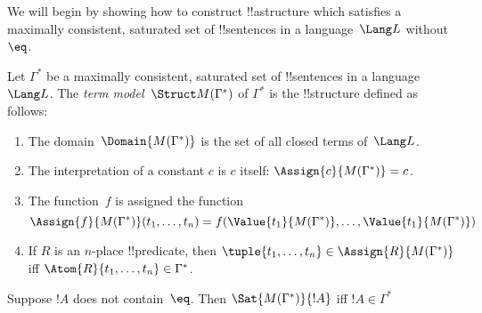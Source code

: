 \documentclass[../../include/open-logic-section]{subfiles}
\begin{document}

We will begin by showing how to construct !!a{structure} which
satisfies a maximally consistent, saturated set of !!{sentence}s in a
language~$\Lang L$ without~$\eq$.

\begin{defn}
Let $\Gamma^*$ be a maximally consistent, saturated set of !!{sentence}s
in a language~$\Lang L$.  The \emph{term model}~$\Struct M(\Gamma^*)$
of $\Gamma^*$ is the !!{structure} defined as follows:
\begin{enumerate}
\item The domain~$\Domain{M(\Gamma^*)}$ is the set of all closed terms
  of~$\Lang L$.
\item The interpretation of a constant $c$ is $c$ itself:
  $\Assign{c}{M(\Gamma^*)} = c$.
\item The function~$f$ is assigned the function
\[
\Assign{f}{M(\Gamma^*)}(t_1, \dots, t_n) = f(\Value{t_1}{M(\Gamma^*)},
\dots, \Value{t_1}{M(\Gamma^*)})
\]
\item If $R$ is an $n$-place !!{predicate}, then $\tuple{t_1, \dots,
  t_n} \in \Assign{R}{M(\Gamma^*)}$ iff $\Atom{R}{t_1, \dots,
    t_n} \in \Gamma^*$.
\end{enumerate}
\end{defn}

\begin{lem}
Suppose $!A$ does not contain~$\eq$. Then
$\Sat{M(\Gamma^*)}{!A}$ iff $!A \in \Gamma^*$
\end{lem}
\end{document}
